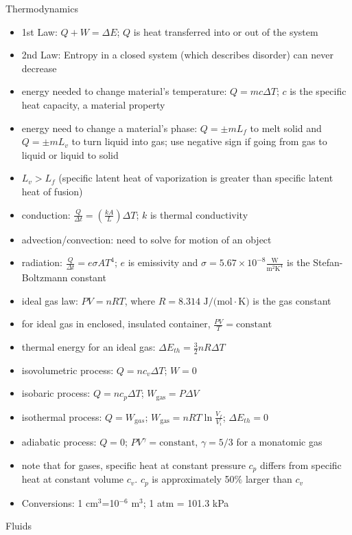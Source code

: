 \documentclass[11pt,letterpaper]{article}
\begin{document}
Thermodynamics
\begin{itemize}
\item 1st Law: $Q+W=\Delta{E}$; $Q$ is heat transferred into or out of the system
\item 2nd Law: Entropy in a closed system (which describes disorder) can never decrease
\item energy needed to change material's temperature: $Q=mc\Delta{T}$; $c$ is the specific heat capacity, a material property
\item energy need to change a material's phase: $Q=\pm mL_f$ to melt solid and $Q=\pm mL_v$ to turn liquid into gas; use negative sign if going from gas to liquid or liquid to solid
\item $L_v>L_f$ (specific latent heat of vaporization is greater than specific latent heat of fusion)
\item conduction: $\frac{Q}{\Delta{t}}=\left(\frac{kA}{L}\right)\Delta{T}$; $k$ is thermal conductivity
\item advection/convection: need to solve for motion of an object
\item radiation: $\frac{Q}{\Delta{t}}=e\sigma{A}T^4$; $e$ is emissivity and $\sigma=5.67\times{10}^{-8}\frac{\mbox{W}}{\mbox{m}^2\mbox{K}^4}$ is the Stefan-Boltzmann constant
\item ideal gas law: $PV=nRT$, where $R=8.314\mbox{ J/(mol}\cdot\mbox{K)}$ is the gas constant
\item for ideal gas in enclosed, insulated container, $\frac{PV}{T}=\mbox{constant}$
\item thermal energy for an ideal gas: $\Delta E_{th} = \frac{3}{2}nR\Delta T$
\item isovolumetric process: $Q=nc_v\Delta{T}$; $W=0$
\item isobaric process: $Q=nc_p\Delta{T}$; $W_{\mathrm{gas}}=P\Delta{V}$
\item isothermal process: $Q=W_{\mathrm gas}$; $W_{\mathrm{gas}}=nRT\ln\frac{V_f}{V_i}$; $\Delta E_{th}=0$  
\item adiabatic process: $Q=0$; $PV^\gamma=\mbox{constant}$, $\gamma=5/3$ for a monatomic gas 
\item note that for gases, specific heat at constant pressure $c_p$ differs from specific heat at constant volume $c_v$. $c_p$ is approximately 50$\%$ larger than $c_v$
\item Conversions: 1 cm$^3$=10$^{-6}$ m$^3$; 1 atm = 101.3 kPa
\end{itemize}
Fluids
\end{document}
